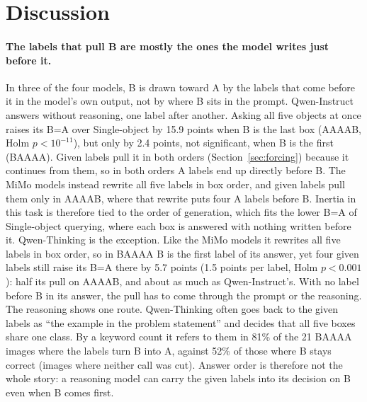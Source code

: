 \providecommand{\tbd}{\textcolor{red}{TBD}}

\section{Discussion}
\label{sec:discussion}

\paragraph{The labels that pull B are mostly the ones the model writes just before it.} In three of
the four models, B is drawn toward A by the labels that come before it in the model's own output,
not by where B sits in the prompt. Qwen-Instruct answers without reasoning, one label after
another. Asking all five objects at once raises its B=A over Single-object by 15.9 points when B is
the last box (AAAAB, Holm $p<10^{-11}$), but only by 2.4 points, not significant, when B is the first
(BAAAA). Given labels pull it in both orders (Section~\ref{sec:forcing}) because it continues from
them, so in both orders A labels end up directly before B. The MiMo models instead rewrite all five
labels in box order, and given labels pull them only in AAAAB, where that rewrite puts four A labels
before B. Inertia in this task is therefore tied to the order of generation, which fits the lower
B=A of Single-object querying, where each box is answered with nothing written before it.
Qwen-Thinking is the exception. Like the MiMo models it rewrites all five labels in box order, so in
BAAAA B is the first label of its answer, yet four given labels still raise its B=A there by 5.7
points (1.5 points per label, Holm $p<0.001$): half its pull on AAAAB, and about as much as
Qwen-Instruct's. With no label before B in its answer, the pull has to come through the prompt or the
reasoning. The reasoning shows one route. Qwen-Thinking often goes back to the given labels as ``the
example in the problem statement'' and decides that all five boxes share one class. By a keyword
count it refers to them in 81\% of the 21 BAAAA images where the labels turn B into A, against 52\%
of those where B stays correct (images where neither call was cut). Answer order is therefore not the
whole story: a reasoning model can carry the given labels into its decision on B even when B comes
first.

